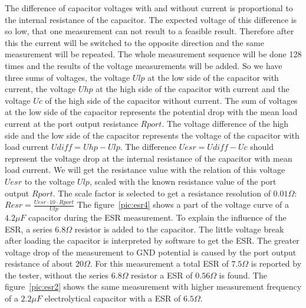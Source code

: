 The difference of capacitor voltages with and without current is proportional to the internal resistance of the capacitor. 
The expected voltage of this difference is so low, that one measurement can not result to a feasible result.
Therefore after this the current will be switched to the opposite direction and the same measurement will be repeated.
The whole measurement sequence will be done 128 times and the results of the voltage measurements will be added.
So we have three sums of voltages, the voltage \(Ulp\) at the low side of the capacitor with current, the voltage \(Uhp\) at
the high side of the capacitor with current and the voltage \(Uc\) of the high side of the capacitor without current.
The sum of voltages at the low side of the capacitor represents the potential drop with the mean load current at
the port output resistance \(Rport\). 
The voltage difference  of the high side and the low side of the capacitor represents the voltage of the capacitor with
load current \(Udiff = Uhp - Ulp\).
The difference \(Uesr = Udiff - Uc\) should represent the voltage drop at the internal resistance of the capacitor with
mean load current.
We will get the resistance value with the relation of this voltage \(Uesr\) to the voltage \(Ulp\), scaled with the
known resistance value of the port output \(Rport\).
The scale factor is selected to get a resistance resolution of \(0.01 \Omega\):  \(Resr = \frac{Uesr \cdot 10 \cdot Rport}{Ulp}\)
The figure~\ref{pic:esr4} shows a part of the voltage curve of a \(4.2\mu F\) capacitor during the ESR measurement.
To explain the influence of the ESR, a series \(6.8 \Omega\) resistor is added to the capacitor.
The little voltage break after loading the capacitor is interpreted by software to get the ESR.
The greater voltage drop of the measurement to GND potential is caused by the port output resistance of about \(20 \Omega\).
For this measurement a total ESR of \(7.5 \Omega\) is reported by the tester, without the series \(6.8 \Omega\) resistor a ESR of \(0.56 \Omega\) is found.
The figure~\ref{pic:esr2} shows the same measurement with higher measurement frequency of a \(2.2 \mu F\) electrolytical capacitor
with a ESR of \(6.5 \Omega\).


